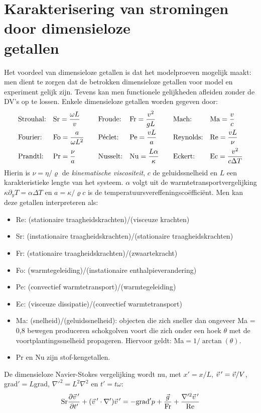 \documentclass[twoside]{report}
\begin{document}
\section[Karakterisering van stromingen door dimensieloze getallen]
{Karakterisering van stromingen door dimensieloze\\ getallen}
Het voordeel van dimensieloze getallen is dat het modelproeven mogelijk
maakt: men dient te zorgen dat de betrokken dimensieloze getallen voor model
en experiment gelijk zijn. Tevens kan men functionele gelijkheden afleiden
zonder de DV's op te lossen. Enkele dimensieloze getallen worden gegeven door:
\[
\begin{array}{l@{~~~}l@{~~~~~~}l@{~~~}l@{~~~~~~}l@{~~~}l}
\mbox{Strouhal:}&\displaystyle{\rm Sr}=\frac{\omega L}{v}&\mbox{Froude:}&\displaystyle{\rm Fr}=\frac{v^2}{gL}&\mbox{Mach:}&\displaystyle{\rm Ma}=\frac{v}{c}\\[3mm]
\mbox{Fourier:}&\displaystyle{\rm Fo}=\frac{a}{\omega L^2}&\mbox{P\'eclet:}&\displaystyle{\rm Pe}=\frac{vL}{a}&\mbox{Reynolds:}&\displaystyle{\rm Re}=\frac{vL}{\nu}\\[3mm]
\mbox{Prandtl:}&\displaystyle{\rm Pr}=\frac{\nu}{a}&\mbox{Nusselt:}&\displaystyle{\rm Nu}=\frac{L\alpha}{\kappa}&\mbox{Eckert:}&\displaystyle{\rm Ec}=\frac{v^2}{c\Delta T}
\end{array}
\]
Hierin is $\nu=\eta/\varrho$ de {\it kinematische viscositeit}, $c$ de
geluidssnelheid en $L$ een karakteristieke lengte van het systeem. $\alpha$
volgt uit de warmtetransportvergelijking $\kappa\partial_yT=\alpha\Delta T$
en $a=\kappa/\varrho c$ is de temperatuursvereffeningsco\"effici\"ent.
\npar
Men kan deze getallen interpreteren als:
\begin{itemize}
\item Re: (stationaire traagheidskrachten)/(visceuze krachten)
\item Sr: (instationaire traagheidskrachten)/(stationaire traagheidskrachten)
\item Fr: (stationaire traagheidskrachten)/(zwaartekracht)
\item Fo: (warmtegeleiding)/(instationaire enthalpieverandering)
\item Pe: (convectief warmtetransport)/(warmtegeleiding)
\item Ec: (visceuze dissipatie)/(convectief warmtetransport)
\item Ma: (snelheid)/(geluidssnelheid): objecten die zich sneller dan ongeveer
          Ma = 0,8 bewegen produceren schokgolven voort die zich onder een hoek
          $\theta$ met de voortplantingssnelheid propageren. Hiervoor geldt:
          Ma$=1/\arctan(\theta)$.
\item Pr en Nu zijn stof-kengetallen.
\end{itemize}
De dimensieloze Navier-Stokes vergelijking wordt nu, met $x'=x/L$,
$\vec{v}\,'=\vec{v}/V$, grad$'=L$grad, $\nabla'^2=L^2\nabla^2$ en $t'=t\omega$:
\[
{\rm Sr}\frac{\partial \vec{v}\,'}{\partial t'}+(\vec{v}\,'\cdot\nabla')\vec{v}\,'=-{\rm grad}'p+\frac{\vec{g}}{\rm Fr}
+\frac{\nabla'^2\vec{v}\,'}{\rm Re}
\]
\end{document}
